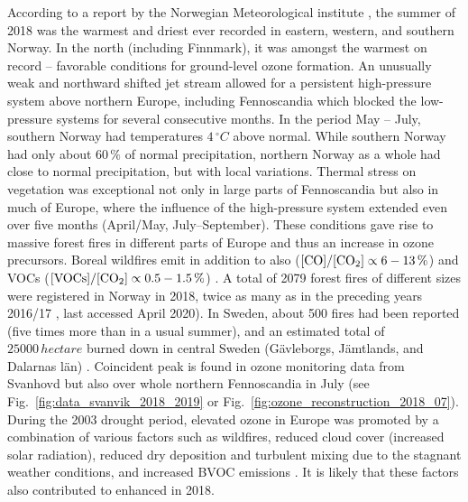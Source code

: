\documentclass[bg, manuscript]{copernicus}
\begin{document}
According to a report by the Norwegian Meteorological institute \citep{MetNOR2019}, the summer of 2018 was the warmest and driest ever recorded in eastern, western, and southern Norway. In the north (including Finnmark), it was amongst the warmest on record -- favorable conditions for ground-level ozone formation.
An unusually weak and northward shifted jet stream allowed for a persistent high-pressure system above northern Europe, including Fennoscandia which blocked the low-pressure systems for several consecutive months. In the period May -- July, southern Norway had temperatures $4\,\unit{^\circ C}$ above normal. While southern Norway had only about $60\,\unit{\%}$ of normal precipitation, northern Norway as a whole had close to normal precipitation, but with local variations.
Thermal stress on vegetation was exceptional not only in large parts of Fennoscandia but also in much of Europe, where the influence of the high-pressure system extended even over five months (April/May, July--September). These conditions gave rise to massive forest fires in different parts of Europe and thus an increase in ozone precursors. Boreal wildfires emit in addition to  also  ($\chem{[CO]}/\chem{[CO_2]} \propto 6-13\,\unit{\%}$) and VOCs ($\chem{[VOCs]}/\chem{[CO_2]} \propto 0.5-1.5\,\unit{\%}$) \citep{AE:Cofer1990}.
A total of 2079 forest fires of different sizes were registered in Norway in 2018, twice as many as in the preceding years 2016/17 \citep{DSB2019}, last accessed April 2020). In Sweden, about 500 fires had been reported (five times more than in a usual summer), and an estimated total of $25000\,\unit{hectare}$ burned down in central Sweden (G\"{a}vleborgs, J\"{a}mtlands, and Dalarnas l\"{a}n) \citep{SOU2019}. Coincident peak \chem{[O_3]} is found in ozone monitoring data from Svanhovd but also over whole northern Fennoscandia in July (see Fig.~\ref{fig:data_svanvik_2018_2019} or Fig.~\ref{fig:ozone_reconstruction_2018_07}).
During the 2003 drought period, elevated ozone in Europe was promoted by a combination of various factors such as wildfires, reduced cloud cover (increased solar radiation), reduced dry deposition and turbulent mixing due to the stagnant weather conditions, and increased BVOC emissions \citep{JGR:Solberg2018}. It is likely that these factors also contributed to enhanced \chem{[O_3]} in 2018.\\
\end{document}
